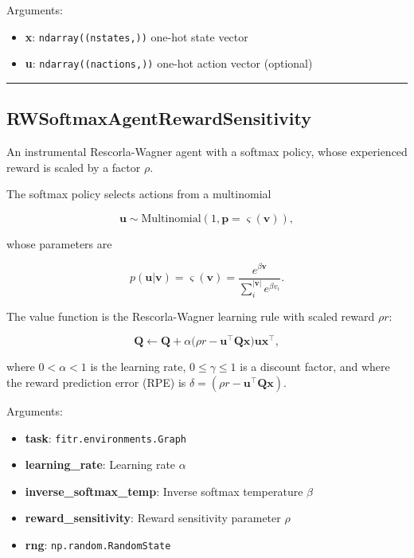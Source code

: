 Arguments:

\begin{itemize}
\tightlist
\item
  \textbf{x}: \texttt{ndarray((nstates,))} one-hot state vector
\item
  \textbf{u}: \texttt{ndarray((nactions,))} one-hot action vector
  (optional)
\end{itemize}

\begin{center}\rule{0.5\linewidth}{\linethickness}\end{center}

\hypertarget{rwsoftmaxagentrewardsensitivity}{%
\subsection{RWSoftmaxAgentRewardSensitivity}\label{rwsoftmaxagentrewardsensitivity}}

\begin{Shaded}
\begin{Highlighting}[]
\end{Highlighting}
\end{Shaded}

An instrumental Rescorla-Wagner agent with a softmax policy, whose
experienced reward is scaled by a factor \(\rho\).

The softmax policy selects actions from a multinomial

\[
\mathbf u \sim \mathrm{Multinomial}(1, \mathbf p=\varsigma(\mathbf v)),
\]

whose parameters are

\[
p(\mathbf u|\mathbf v) = \varsigma(\mathbf v) = \frac{e^{\beta \mathbf v}}{\sum_{i}^{|\mathbf v|} e^{\beta v_i}}.
\]

The value function is the Rescorla-Wagner learning rule with scaled
reward \(\rho r\):

\[
\mathbf Q \gets \mathbf Q + \alpha \big(\rho r - \mathbf u^\top \mathbf Q \mathbf x \big) \mathbf u \mathbf x^\top,
\]

where \(0 < \alpha < 1\) is the learning rate, \(0 \leq \gamma \leq 1\)
is a discount factor, and where the reward prediction error (RPE) is
\(\delta = (\rho r - \mathbf u^\top \mathbf Q \mathbf x)\).

Arguments:

\begin{itemize}
\tightlist
\item
  \textbf{task}: \texttt{fitr.environments.Graph}
\item
  \textbf{learning\_rate}: Learning rate \(\alpha\)
\item
  \textbf{inverse\_softmax\_temp}: Inverse softmax temperature \(\beta\)
\item
  \textbf{reward\_sensitivity}: Reward sensitivity parameter \(\rho\)
\item
  \textbf{rng}: \texttt{np.random.RandomState}
\end{itemize}

